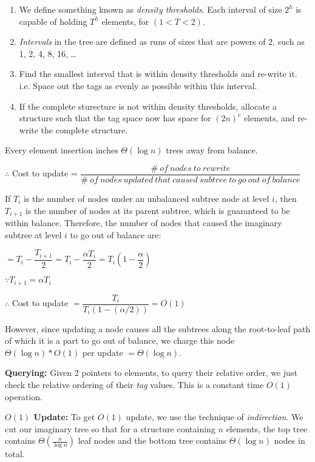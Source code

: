 \documentclass{article}
\begin{document}
\begin{enumerate}

\item We define something known as \textit{density thresholds}. Each
  interval of size $2^h$ is capable of holding $T^h$ elements, for $(1
  < T < 2)$.

\item \textit{Intervals} in the tree are defined as runs of sizes that
  are powers of 2, such as 1, 2, 4, 8, 16, \ldots{}

\item Find the smallest interval that is within density thresholds and
  re-write it. i.e. Space out the tags as evenly as possible within
  this interval.

\item If the complete sturecture is not within density thresholds,
  allocate a structure such that the tag space now has space for
  ${(2n)}^c$ elements, and re-write the complete structure.

\end{enumerate}

Every element insertion inches $\Theta(\log{n})$ trees away from
balance.

$\therefore$ Cost to update =
$\dfrac{\#\ of\ nodes\ to\ rewrite}{\#\ of\ nodes\ updated\ that\ caused\ subtree\ to\ go\ out\ of\ balance}$

If $T_i$ is the number of nodes under an unbalanced subtree node at
level $i$, then $T_{i+1}$ is the number of nodes at its parent
subtree, which is guaranteed to be within balance. Therefore, the
number of nodes that caused the imaginary subtree at level $i$ to go
out of balance are:

$= T_i - \dfrac{T_{i+1}}{2} = T_i - \dfrac{\alpha T_i}{2} =
T_i\left(1-\dfrac{\alpha}{2}\right)$

$\because T_{i+1} = \alpha T_i$

$\therefore$ Cost to update $= \dfrac{T_i}{T_i(1-(\alpha/2))} = O(1)$

However, since updating a node causes all the subtrees along the
root-to-leaf path of which it is a part to go out of balance, we
charge this node $\Theta(\log{n}) * O(1)$ per update
$=\Theta(\log{n})$.

\textbf{Querying:} Given 2 pointers to elements, to query their
relative order, we just check the relative ordering of their
\textit{tag} values. This is a constant time $O(1)$ operation.

\textbf{$O(1)$ Update:} To get $O(1)$ update, we use the technique of
\textit{indirection}. We cut our imaginary tree so that for a
structure containing $n$ elements, the top tree contains
$\Theta(\frac{n}{\log{n}})$ leaf nodes and the bottom tree contains
$\Theta(\log{n})$ nodes in total.
\end{document}
